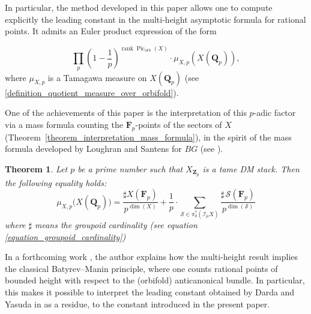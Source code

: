 \documentclass{proc-l}
\newcommand{\Z}{\mathbf{Z}}
\newcommand{\Q}{\mathbf{Q}}
\newcommand{\F}{\mathbf{F}}
\DeclareMathOperator{\Pic}{Pic}
\DeclareMathOperator{\rank}{rank}
\DeclareMathOperator{\orb}{orb}
\newcommand{\stackS}{\mathcal{S}}
\newcommand{\sheafI}{\mathcal{I}}
\newcommand{\twistsector}{\pi_0^*(\sheafI_{\mu} X)}
\newtheorem{theorem}{Theorem}[section]
\theoremstyle{definition}
\theoremstyle{remark}
\numberwithin{equation}{section}
\begin{document}
In particular, the method developed in this paper allows one to compute explicitly the leading constant in the multi-height asymptotic formula for rational points. It admits an Euler product expression of the form

\[
\prod_{p}
\left( 1 - \frac{1}{p} \right)^{\rank \Pic_{\orb}(X)}
\cdot
\mu_{X,p}(X(\Q_p)),
\]where $\mu_{X,p}$ is a Tamagawa measure on $X(\Q_p)$ (see \ref{definition_quotient_measure_over_orbifold}).

One of the achievements of this paper is the interpretation of this $p$-adic factor via a mass formula counting the $\F_p$-points of the sectors of $X$ (Theorem~\ref{theorem_interpretation_mass_formula}), in the spirit of the mass formula developed by Loughran and Santens for $BG$ (see \cite[Corollary~8.11]{loughran_santens_malle_conjecture}).

\begin{theorem}
Let $p$ be a prime number such that $X_{\Z_p}$ is a tame DM stack. Then the following equality holds:
\[
\mu_{X,p}\bigl(X(\Q_p)\bigr)
= \frac{\sharp X(\F_p)}{p^{\dim(X)}}  + \frac{1}{p} \cdot
\sum\limits_{\stackS \in \twistsector} 
\frac{\sharp\, \stackS\!\left(\F_p\right)}{p^{\dim(\stackS)}}
\]where $\sharp$ means the groupoid cardinality (see equation \ref{equation_groupoid_cardinality})
\end{theorem}

In a forthcoming work \cite{bongiorno_hyperbola_method}, the author explains how the multi-height result implies the classical Batyrev--Manin principle, where one counts rational points of bounded height with respect to the (orbifold) anticanonical bundle. In particular, this makes it possible to interpret the leading constant obtained by Darda and Yasuda in \cite[Corollary 4.4.5]{darda_yasuda_toric_stacks_batyrev} as a residue, to the constant introduced in the present paper. 
\end{document}
